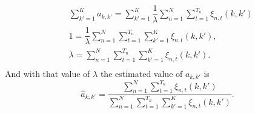 \documentclass[12pt]{article}
\begin{document}
\begin{equation}
\begin{split}
& \sum \limits_{k'=1}^{K}a_{k,k'} = \sum \limits_{k'=1}^{K} \dfrac{1}{\lambda} \sum \limits_{n=1}^{N}\sum _ { t = 1 } ^ { T _ { n } } \xi_{n,t}(k,k')\\
& 1 = \dfrac{1}{\lambda} \sum \limits_{n=1}^{N}\sum _ { t = 1 } ^ { T _ { n } }\sum \limits_{k'=1}^{K}\xi_{n,t}(k,k'),\\
& \lambda = \sum \limits_{n=1}^{N}\sum \limits_{ t = 1 } ^ { T _ { n }}\sum \limits_{k'=1}^{K}\xi_{n,t}(k,k').\\
\end{split}
\end{equation}
And with that value of $\lambda$ the estimated value of $a_{k,k'}$ is
\begin{equation}
\widehat{a}_{k,k'} = \dfrac{\sum \limits_{n=1}^{N} \sum \limits_ { t = 1 } ^ { T _ { n } }\xi_{n,t}(k,k')}{\sum \limits_{n=1}^{N}\sum \limits_ { t = 1 } ^ { T _ { n } }\sum \limits_{k'=1}^{K}\xi_{n,t}(k,k')}.
\end{equation}

\nocite{*}
\printbibliography
\end{document}
